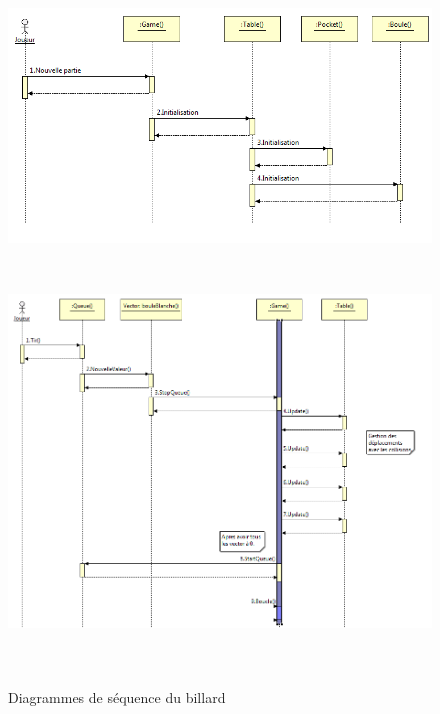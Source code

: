 \begin{figure}[h]
 \centering
 \includegraphics[height=6.5cm]{../umls/UML_images/Billard/sequence1} \hfill
 \includegraphics[height=11cm]{../umls/UML_images/Billard/sequence2} \hfill
 \caption{Diagrammes de séquence du billard}
\end{figure}

\clearpage

